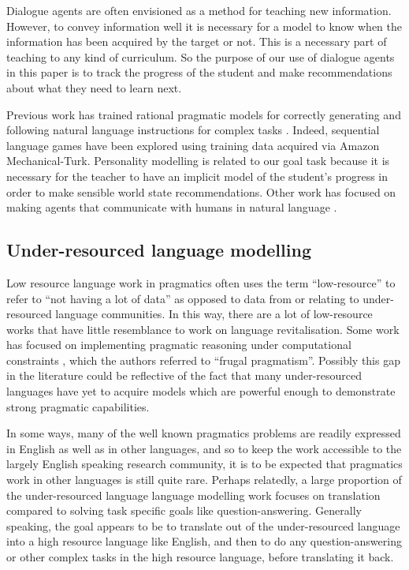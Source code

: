 Dialogue agents are often envisioned as a method for teaching new information. However, to convey information well it is necessary for a model to know when the information has been acquired by the target or not. This is a necessary part of teaching to any kind of curriculum. So the purpose of our use of dialogue agents in this paper is to track the progress of the student and make recommendations about what they need to learn next.

Previous work has trained rational pragmatic models for correctly generating and following natural language instructions for complex tasks \cite{fried2017unified}. Indeed, sequential language games \cite{khani2018planning} have been explored using training data acquired via Amazon Mechanical-Turk. Personality modelling \cite{yang2020improving} is related to our goal task because it is necessary for the teacher to have an implicit model of the student's progress in order to make sensible world state recommendations. Other work has focused on making agents that communicate with humans in natural language \cite{lazaridou2020multi}.

\subsection{Under-resourced language modelling}

Low resource language work in pragmatics often uses the term ``low-resource'' to refer to ``not having a lot of data'' as opposed to data from or relating to under-resourced language communities. In this way, there are a lot of low-resource works that have little resemblance to work on language revitalisation. Some work has focused on implementing pragmatic reasoning under computational constraints \cite{van2020simple}, which the authors referred to ``frugal pragmatism''. Possibly this gap in the literature could be reflective of the fact that many under-resourced languages have yet to acquire models which are powerful enough to demonstrate strong pragmatic capabilities.

In some ways, many of the well known pragmatics problems are readily expressed in English as well as in other languages, and so to keep the work accessible to the largely English speaking research community, it is to be expected that pragmatics work in other languages is still quite rare. Perhaps relatedly, a large proportion of the under-resourced language language modelling work focuses on translation compared to solving task specific goals like question-answering. Generally speaking, the goal appears to be to translate out of the under-resourced language into a high resource language like English, and then to do any question-answering or other complex tasks in the high resource language, before translating it back.
